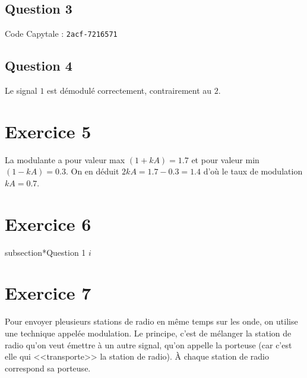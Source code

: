 \documentclass{article}
\begin{document}
\subsection*{Question 3}

Code Capytale : \texttt{2acf-7216571}

\subsection*{Question 4}

Le signal $1$ est démodulé correctement, contrairement au $2$.

\section*{Exercice 5}

\begin{center}
\end{center}

La modulante a pour valeur max $(1+kA)=1.7$ et pour valeur min $(1-kA)=0.3$. On en déduit $2kA=1.7-0.3=1.4$ d'où le taux de modulation $kA=0.7$.

\section*{Exercice 6}

subsection*{Question 1}
$i$


\section*{Exercice 7}
Pour envoyer pleusieurs stations de radio en même temps sur les onde, on utilise une technique appelée modulation. Le principe, c'est de mélanger la station de radio qu'on veut émettre à un autre signal, qu'on appelle la porteuse (car c'est elle qui <<transporte>> la station de radio). À chaque station de radio correspond sa porteuse.
\end{document}
